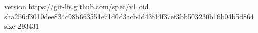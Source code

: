 version https://git-lfs.github.com/spec/v1
oid sha256:f3010dee834c98b663551e71d0d3acb4d43f44f37ef3bb503230b16b04b5d864
size 293431
